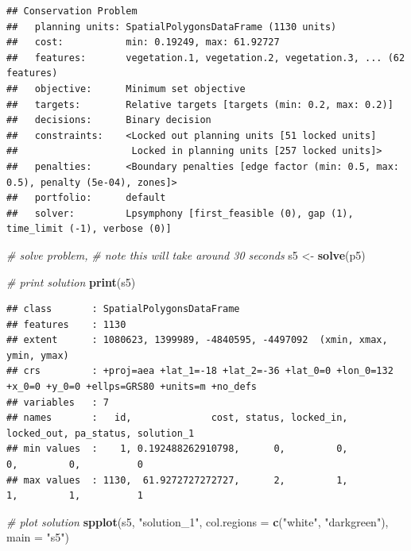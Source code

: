 \documentclass[12pt,]{book}
\newenvironment{Shaded}{\begin{snugshade}}{\end{snugshade}}
\newcommand{\KeywordTok}[1]{\textcolor[rgb]{0.13,0.29,0.53}{\textbf{#1}}}
\newcommand{\DataTypeTok}[1]{\textcolor[rgb]{0.13,0.29,0.53}{#1}}
\newcommand{\StringTok}[1]{\textcolor[rgb]{0.31,0.60,0.02}{#1}}
\newcommand{\CommentTok}[1]{\textcolor[rgb]{0.56,0.35,0.01}{\textit{#1}}}
\newcommand{\NormalTok}[1]{#1}
\begin{document}
\begin{verbatim}
## Conservation Problem
##   planning units: SpatialPolygonsDataFrame (1130 units)
##   cost:           min: 0.19249, max: 61.92727
##   features:       vegetation.1, vegetation.2, vegetation.3, ... (62 features)
##   objective:      Minimum set objective 
##   targets:        Relative targets [targets (min: 0.2, max: 0.2)]
##   decisions:      Binary decision 
##   constraints:    <Locked out planning units [51 locked units]
##                    Locked in planning units [257 locked units]>
##   penalties:      <Boundary penalties [edge factor (min: 0.5, max: 0.5), penalty (5e-04), zones]>
##   portfolio:      default
##   solver:         Lpsymphony [first_feasible (0), gap (1), time_limit (-1), verbose (0)]
\end{verbatim}

\begin{Shaded}
\begin{Highlighting}[]
\CommentTok{# solve problem,}
\CommentTok{# note this will take around 30 seconds}
\NormalTok{s5 <-}\StringTok{ }\KeywordTok{solve}\NormalTok{(p5)}

\CommentTok{# print solution}
\KeywordTok{print}\NormalTok{(s5)}
\end{Highlighting}
\end{Shaded}

\begin{verbatim}
## class       : SpatialPolygonsDataFrame 
## features    : 1130 
## extent      : 1080623, 1399989, -4840595, -4497092  (xmin, xmax, ymin, ymax)
## crs         : +proj=aea +lat_1=-18 +lat_2=-36 +lat_0=0 +lon_0=132 +x_0=0 +y_0=0 +ellps=GRS80 +units=m +no_defs 
## variables   : 7
## names       :   id,              cost, status, locked_in, locked_out, pa_status, solution_1 
## min values  :    1, 0.192488262910798,      0,         0,          0,         0,          0 
## max values  : 1130,  61.9272727272727,      2,         1,          1,         1,          1
\end{verbatim}

\begin{Shaded}
\begin{Highlighting}[]
\CommentTok{# plot solution}
\KeywordTok{spplot}\NormalTok{(s5, }\StringTok{"solution_1"}\NormalTok{, }\DataTypeTok{col.regions =} \KeywordTok{c}\NormalTok{(}\StringTok{"white"}\NormalTok{, }\StringTok{"darkgreen"}\NormalTok{), }\DataTypeTok{main =} \StringTok{"s5"}\NormalTok{)}
\end{Highlighting}
\end{Shaded}
\end{document}
